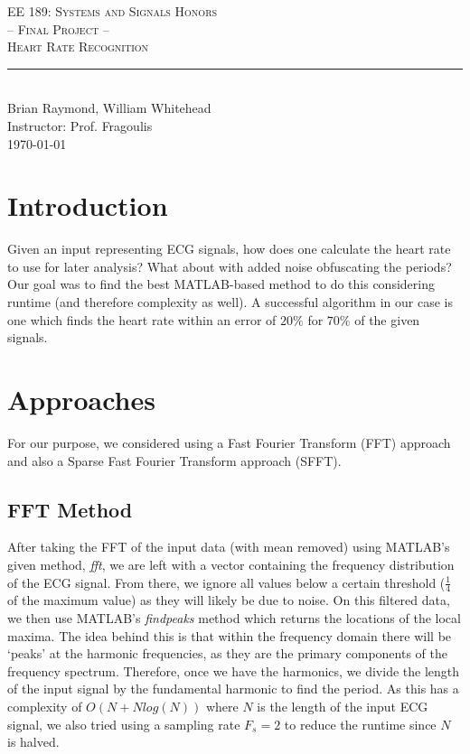 \documentclass[twocolumn]{article}
\newcommand{\rpm}{\raisebox{.2ex}{$\scriptstyle\pm$}}
\newcommand{\classname}{EE 189: Systems and Signals Honors}
\newcommand{\project}{-- Final Project -- \\ Heart Rate Recognition}
\newcommand{\authorname}{Brian Raymond, William Whitehead}
\newcommand{\instructor}{Prof. Fragoulis}
\begin{document}
		
	\begin{center}
		{\large \textsc{\classname \\ \project} \\ \vspace{4pt}}
		\rule[13pt]{\columnwidth}{1pt} \\ %
		{\authorname \\ \vspace{2pt}
			Instructor: \instructor \\ \vspace{2pt}
			\today \\
		}
	\end{center}	
	
	\begin{flushleft}

		\section{Introduction}
		Given an input representing ECG signals, how does one calculate the heart rate to use for later analysis? What about with added noise obfuscating the periods? Our goal was to find the best MATLAB-based method to do this considering runtime (and therefore complexity as well). A successful algorithm in our case is one which finds the heart rate within an error of \rpm$20\%$ for $70\%$ of the given signals. \\ \vspace{-1em}
		
		\section{Approaches}
		For our purpose, we considered using a Fast Fourier Transform (FFT) approach and also a Sparse Fast Fourier Transform approach (SFFT). \\ \vspace{-2em}
		
		\hspace{2em}\subsection{FFT Method}
		After taking the FFT of the input data (with mean removed) using MATLAB's given method, \textit{fft}, we are left with a vector containing the frequency distribution of the ECG signal. From there, we ignore all values below a certain threshold ($\frac{1}{4}$ of the maximum value) as they will likely be due to noise. On this filtered data, we then use MATLAB's \textit{findpeaks} method which returns the locations of the local maxima. The idea behind this is that within the frequency domain there will be `peaks' at the harmonic frequencies, as they are the primary components of the frequency spectrum. Therefore, once we have the harmonics, we divide the length of the input signal by the fundamental harmonic to find the period. As this has a complexity of $O(N+Nlog(N))$ where $N$ is the length of the input ECG signal, we also tried using a sampling rate $F_{s}=2$ to reduce the runtime since $N$ is halved. \\ \vspace{-2em}
		

\end{flushleft}
\end{document}

